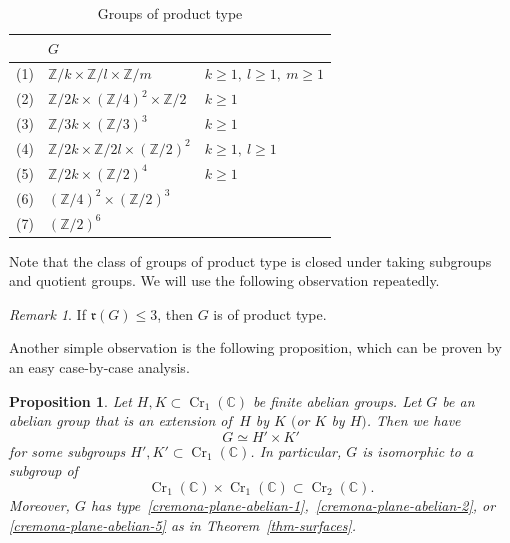 \documentclass[11pt]{amsart}
\numberwithin{equation}{section}
\newtheorem{proposition}[thm]{Proposition}
\theoremstyle{definition}
\theoremstyle{remark}
\newtheorem{remark}[thm]{Remark}
\DeclareMathOperator{\Cr}{Cr}
\begin{document}
\begin{center}
  \begin{table}[h!]
    {\renewcommand{\arraystretch}{1.1}
\begin{tabular}{ | m{1.3em} | m{5.0cm} | m{3.5cm} | } 
  \hline
   & $G$ &  \\ 
  \hline
  (1) & $\mathbb{Z}/k\times \mathbb{Z}/l\times
\mathbb{Z}/m$ & $k\geq 1,\ l\geq 1,\ m\geq 1$ \\ 
  \hline
  (2) & $\mathbb{Z}/2k\times(\mathbb{Z}/4)^2\times
\mathbb{Z}/2$ & $k\geq 1$ \\ 
    \hline
  (3) & $\mathbb{Z}/3k\times(\mathbb{Z}/3)^3$ & $k\geq 1$ \\ 
    \hline
  (4) & $\mathbb{Z}/2k\times \mathbb{Z}/2l\times
(\mathbb{Z}/2)^2$ & $k\geq 1,\ l\geq 1$ \\ 
    \hline
  (5) & $\mathbb{Z}/2k\times (\mathbb{Z}/2)^4$ & $k\geq 1$ \\ 
    \hline
  (6) & $(\mathbb{Z}/4)^2\times (\mathbb{Z}/2)^3$ & \\ 
    \hline
  (7) & $(\mathbb{Z}/2)^6$ &  \\ 
    \hline
\end{tabular}}
\caption{Groups of product type}
  \label{table-1}
\end{table}
\end{center}

Note that the class of groups of product type is closed under taking subgroups and quotient groups.  We will use the following observation repeatedly.

\begin{remark}
\label{rem-rank-bounded-by-3-pt}
If $\mathfrak{r}(G)\leq 3$, then $G$ is of product type.  
\end{remark}

Another simple observation is the following proposition, which can be proven by an easy case-by-case analysis. 

\begin{proposition}
\label{prop-abstact-extension-cr2}
Let $H, K\subset \Cr_1(\mathbb{C})$ be finite abelian groups. Let $G$ be an abelian group that is an extension of\, $H$ by $K$ $($or $K$ by $H)$. Then we have 
\[
G\simeq H'\times K'
\] 
for some subgroups $H', K'\subset \Cr_1(\mathbb{C})$.  
In particular, $G$ is isomorphic to a subgroup of 
\[
\Cr_1(\mathbb{C})\times \Cr_1(\mathbb{C})\subset \Cr_2(\mathbb{C}).
\] 
Moreover, $G$ has type~\eqref{cremona-plane-abelian-1},~\eqref{cremona-plane-abelian-2}, or \eqref{cremona-plane-abelian-5} as in Theorem~\ref{thm-surfaces}.
\end{proposition}
\end{document}
